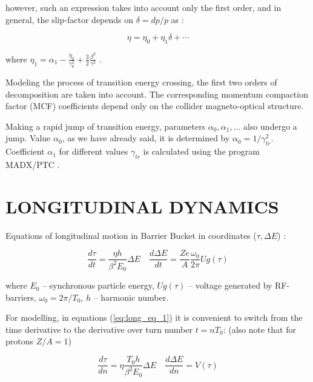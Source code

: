 \documentclass[a4paper]{jpconf}
\begin{document}
\par \noindent however, such an expression takes into account only the first order, and in general, the slip-factor depends on $\delta=dp/p$ as \cite{Ng}:

\begin{equation}\label{eq:eta}
\eta=\eta_{0}+\eta_{1} \delta+\cdots
\end{equation}

\par \noindent where $\eta_{1}=\alpha_{1}-\frac{\eta_{0}}{\gamma_{0}^{2}}+\frac{3}{2} \frac{\beta^{2}}{\gamma^{2}}$ .

\par Modeling the process of transition energy crossing, the first two orders of decomposition are taken into account. The corresponding momentum compaction factor (MCF) coefficients depend only on the collider magneto-optical structure.

\par Making a rapid jump of transition energy, parameters $\alpha_{0}, \alpha_{1},\ldots$ also undergo a jump. Value $\alpha_{0}$, as we have already said, it is determined by  $\alpha_{0}=1/\gamma_{tr}^2$. Coefficient $\alpha_{1}$ for different values $\gamma_{tr}$ is calculated using the program MADX/PTC \cite{MADX}.

\section{LONGITUDINAL DYNAMICS}

Equations of longitudinal motion in Barrier Bucket in coordinates ($\tau,\Delta E$) \cite{Hans}:

\begin{equation}\label{eq:long_eq_1}
\frac{d \tau}{dt}=\frac{\eta h}{\beta^{2} E_{0}} \Delta E \quad \frac{d \Delta E}{dt}=\frac{Ze}{A} \frac{\omega_{0}}{2 \pi} Ug(\tau)
\end{equation}

\noindent where $E_0$ – synchronous particle energy, $Ug(\tau)$ – voltage generated by RF-barriers, $\omega_{0}=2\pi/T_{0}$, $h$ – harmonic number.
\par For modelling, in equations (\ref{eq:long_eq_1}) it is convenient to switch from the time derivative to the derivative over turn number $t=nT_{0}$: (also note that for protons $Z/A=1$)

\begin{equation}\label{eq:long_eq_2}
\frac{d \tau}{d n}=\eta \frac{T_{0} h}{\beta^{2} E_{0}} \Delta E \quad \frac{d \Delta E}{d n}=V(\tau)
\end{equation}
\end{document}
